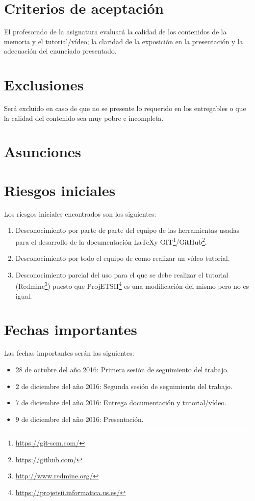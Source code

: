 \documentclass[a4paper,10pt]{scrartcl}
\begin{document}
\section{Criterios de aceptación}
El profesorado de la asignatura evaluará la calidad de los contenidos de la memoria y el tutorial/vídeo; la claridad de la exposición en la presentación y la adecuación del enunciado presentado.

\section{Exclusiones}
Será excluido en caso de que no se presente lo requerido en los entregables o que la calidad del contenido sea muy pobre e incompleta.


\section{Asunciones}

\section{Riesgos iniciales}

Los riesgos iniciales encontrados son los siguientes:
\begin{enumerate}
	\item Desconocimiento por parte de parte del equipo de las herramientas usadas para el desarrollo de la documentación \LaTeX y GIT\footnote{\url{https://git-scm.com/}}/GitHub\footnote{\url{https://github.com/}}.
	
	\item Desconocimiento por todo el equipo de como realizar un vídeo tutorial.
	
	\item Desconocimiento parcial del uso para el que se debe realizar el tutorial (Redmine\footnote{\url{http://www.redmine.org/}}) puesto que ProjETSII\footnote{\url{https://projetsii.informatica.us.es/}} es una modificación del mismo pero no es igual.
\end{enumerate}


\section{Fechas importantes}
Las fechas importantes serán las siguientes:

	\begin{itemize}
		\item 28 de octubre del año 2016: Primera sesión de seguimiento del trabajo.
		
		\item 2 de diciembre del año 2016: Segunda sesión de seguimiento del trabajo.
		
		\item 7 de diciembre del año 2016: Entrega documentación y tutorial/vídeo.
		
		\item 9 de diciembre del año 2016: Presentación.
	\end{itemize}
\end{document}
